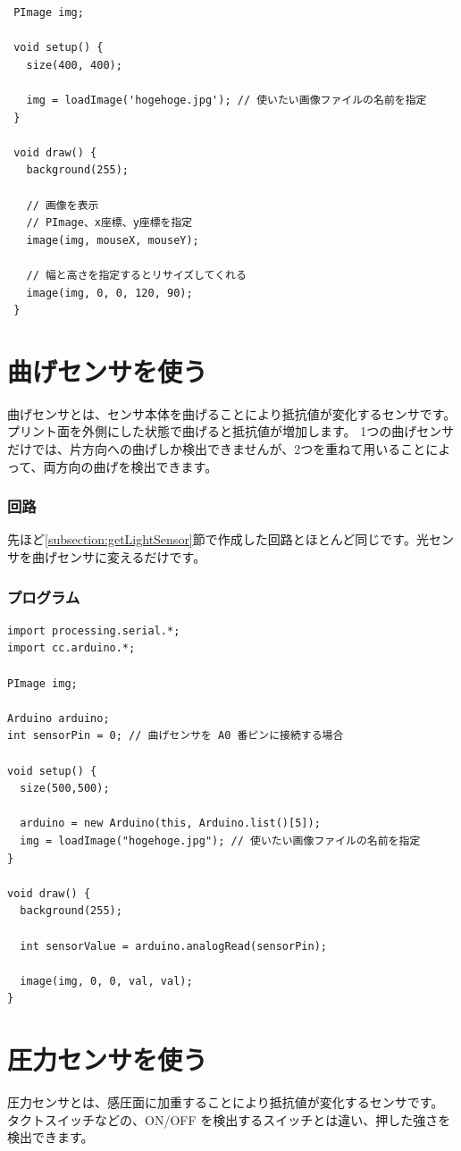 \documentclass[11pt,a4paper]{jarticle}
\begin{document}
\begin{lstlisting}
 PImage img;
 
 void setup() {
   size(400, 400);

   img = loadImage('hogehoge.jpg'); // 使いたい画像ファイルの名前を指定
 }

 void draw() {
   background(255);

   // 画像を表示
   // PImage、x座標、y座標を指定
   image(img, mouseX, mouseY);

   // 幅と高さを指定するとリサイズしてくれる
   image(img, 0, 0, 120, 90);
 }
\end{lstlisting}

\section{曲げセンサを使う}
曲げセンサとは、センサ本体を曲げることにより抵抗値が変化するセンサです。
プリント面を外側にした状態で曲げると抵抗値が増加します。
1つの曲げセンサだけでは、片方向への曲げしか検出できませんが、2つを重ねて用いることによって、両方向の曲げを検出できます。

\subsubsection*{回路}
先ほど\ref{subsection:getLightSensor}節で作成した回路とほとんど同じです。光センサを曲げセンサに変えるだけです。

\subsubsection*{プログラム}
\begin{lstlisting}
import processing.serial.*;
import cc.arduino.*;

PImage img;

Arduino arduino;
int sensorPin = 0; // 曲げセンサを A0 番ピンに接続する場合

void setup() {
  size(500,500);
  
  arduino = new Arduino(this, Arduino.list()[5]);
  img = loadImage("hogehoge.jpg"); // 使いたい画像ファイルの名前を指定
}

void draw() {
  background(255);
  
  int sensorValue = arduino.analogRead(sensorPin);
    
  image(img, 0, 0, val, val);
}
\end{lstlisting}

\section{圧力センサを使う}
圧力センサとは、感圧面に加重することにより抵抗値が変化するセンサです。
タクトスイッチなどの、ON/OFF を検出するスイッチとは違い、押した強さを検出できます。
\end{document}
